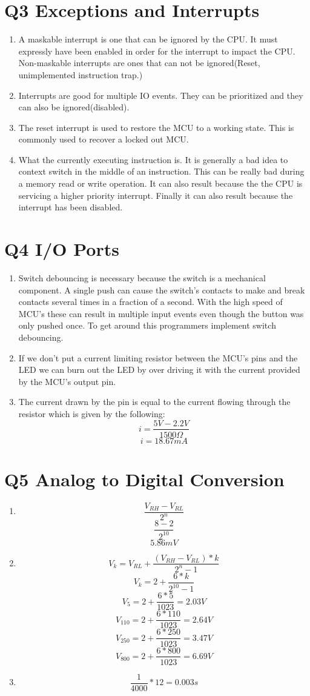 \documentclass{article}
\begin{document}
	\section*{Q3 Exceptions and Interrupts}
	\begin{enumerate}
		\item A maskable interrupt is one that can be ignored by the CPU. It must expressly have been enabled in order for the interrupt to impact the CPU. Non-maskable interrupts are ones that can not be ignored(Reset, unimplemented instruction trap.)
		\item Interrupts are good for multiple IO events. They can be prioritized and they can also be ignored(disabled).
		\item The reset interrupt is used to restore the MCU to a working state. This is commonly used to recover a locked out MCU.
		\item What the currently executing instruction is. It is generally a bad idea to context switch in the middle of an instruction. This can be really bad during a memory read or write operation. It can also result because the the CPU is servicing a higher priority interrupt. Finally it can also result because the interrupt has been disabled.
	\end{enumerate}
	\section*{Q4 I/O Ports}
	\begin{enumerate}
		\item Switch debouncing is necessary because the switch is a mechanical component. A single push can cause the switch's contacts to make and break contacts several times in a fraction of a second. With the high speed of MCU's these can result in multiple input events even though the button was only pushed once. To get around this programmers implement switch debouncing.
		\item If we don't put a current limiting resistor between the MCU's pins and the LED we can burn out the LED by over driving it with the current provided by the MCU's output pin.
		\item The current drawn by the pin is equal to the current flowing through the resistor which is given by the following:
		$$i = \frac{5V - 2.2V}{1500\Omega}$$
		$$i = 18.67mA$$
	\end{enumerate}
	\section*{Q5 Analog to Digital Conversion}
	\begin{enumerate}
		\item $$\frac{V_{RH}-V_{RL}}{2^{n}}$$
		$$\frac{8-2}{2^{10}}$$
		$$5.86mV$$
		\item $$V_k=V_{RL}+\frac{(V_{RH}-V_{RL})*k}{2^n-1}$$
		$$V_k=2+\frac{6*k}{2^{10}-1}$$
		$$V_5=2+\frac{6*5}{1023}=2.03V$$
		$$V_{110}=2+\frac{6*110}{1023}=2.64V$$
		$$V_{250}=2+\frac{6*250}{1023}=3.47V$$
		$$V_{800}=2+\frac{6*800}{1023}=6.69V$$
		\item $$\frac{1}{4000}*12=0.003s$$
	\end{enumerate}
\end{document}
